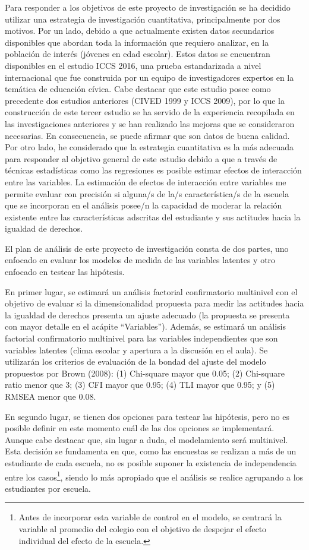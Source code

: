 \documentclass[12pt,twoside]{templates/facsothesis}
\begin{document}
Para responder a los objetivos de este proyecto de investigación se ha decidido utilizar una estrategia de investigación cuantitativa, principalmente por dos motivos. Por un lado, debido a que actualmente existen datos secundarios disponibles que abordan toda la información que requiero analizar, en la población de interés (jóvenes en edad escolar). Estos datos se encuentran disponibles en el estudio ICCS 2016, una prueba estandarizada a nivel internacional que fue construida por un equipo de investigadores expertos en la temática de educación cívica. Cabe destacar que este estudio posee como precedente dos estudios anteriores (CIVED 1999 y ICCS 2009), por lo que la construcción de este tercer estudio se ha servido de la experiencia recopilada en las investigaciones anteriores y se han realizado las mejoras que se consideraron necesarias. En consecuencia, se puede afirmar que son datos de buena calidad. Por otro lado, he considerado que la estrategia cuantitativa es la más adecuada para responder al objetivo general de este estudio debido a que a través de técnicas estadísticas como las regresiones es posible estimar efectos de interacción entre las variables. La estimación de efectos de interacción entre variables me permite evaluar con precisión si alguna/s de la/s característica/s de la escuela que se incorporan en el análisis posee/n la capacidad de moderar la relación existente entre las características adscritas del estudiante y sus actitudes hacia la igualdad de derechos.

El plan de análisis de este proyecto de investigación consta de dos partes, uno enfocado en evaluar los modelos de medida de las variables latentes y otro enfocado en testear las hipótesis.

En primer lugar, se estimará un análisis factorial confirmatorio multinivel con el objetivo de evaluar si la dimensionalidad propuesta para medir las actitudes hacia la igualdad de derechos presenta un ajuste adecuado (la propuesta se presenta con mayor detalle en el acápite ``Variables''). Además, se estimará un análisis factorial confirmatorio multinivel para las variables independientes que son variables latentes (clima escolar y apertura a la discusión en el aula). Se utilizarán los criterios de evaluación de la bondad del ajuste del modelo propuestos por Brown (2008): (1) Chi-square mayor que 0.05; (2) Chi-square ratio menor que 3; (3) CFI mayor que 0.95; (4) TLI mayor que 0.95; y (5) RMSEA menor que 0.08.

En segundo lugar, se tienen dos opciones para testear las hipótesis, pero no es posible definir en este momento cuál de las dos opciones se implementará. Aunque cabe destacar que, sin lugar a duda, el modelamiento será multinivel. Esta decisión se fundamenta en que, como las encuestas se realizan a más de un estudiante de cada escuela, no es posible suponer la existencia de independencia entre los casos\footnote{Antes de incorporar esta variable de control en el modelo, se centrará la variable al promedio del colegio con el objetivo de despejar el efecto individual del efecto de la escuela.}, siendo lo más apropiado que el análisis se realice agrupando a los estudiantes por escuela.
\end{document}
